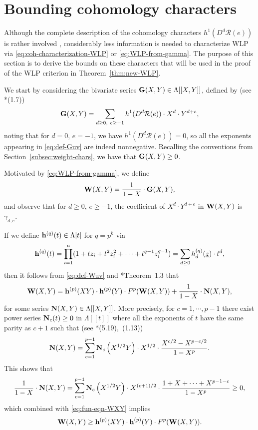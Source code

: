 \documentclass[11pt,reqno]{amsart}
\newcommand{\bG}{{\bf G}}
\newcommand{\bh}{{\bf h}}
\newcommand{\bN}{{\bf N}}
\newcommand{\bW}{{\bf W}}
\newcommand{\mc}[1]{\mathcal{#1}}
\newcommand{\ul}[1]{\underline{#1}}
\theoremstyle{definition}
\theoremstyle{remark}
\numberwithin{equation}{section}
\begin{document}
\section{Bounding cohomology characters}
\label{sec:bound-coh}

Although the complete description of the cohomology characters $h^1(D^d\mc{R}(e))$ is rather involved \cite{KMRR}, considerably less information is needed to characterize WLP via \eqref{eq:coh-characterization-WLP} or \eqref{eq:WLP-from-gamma}. The purpose of this section is to derive the bounds on these characters that will be used in the proof of the WLP criterion in Theorem~\ref{thm:new-WLP}. 

We start by considering the bivariate series $\bG(X,Y)\in\Lambda[[X,Y]]$, defined by (see \cite{KMRR}*{(1.7)})
\begin{equation}\label{eq:def-Guv}
    \bG(X,Y) = \sum_{d\geq 0,\ e\geq -1} h^1(D^d\mc{R}(e))\cdot X^d\cdot Y^{d+e},
\end{equation}
noting that for $d=0$, $e=-1$, we have $h^1(D^d\mc{R}(e))=0$, so all the exponents appearing in \eqref{eq:def-Guv} are indeed nonnegative. Recalling the conventions from Section~\ref{subsec:weight-chars}, we have that $\bG(X,Y)\geq 0$.

Motivated by \eqref{eq:WLP-from-gamma}, we define
\begin{equation}\label{eq:def-Wuv}
    \bW(X,Y) = \frac{1}{1-X}\cdot \bG(X,Y),
\end{equation}
and observe that for $d\geq 0$, $e\geq -1$, the coefficient of $X^d\cdot Y^{d+e}$ in $\bW(X,Y)$ is $\gamma_{d,e}$. 

If we define $\bh^{(q)}(t)\in\Lambda[t]$ for $q=p^k$ via
\[\bh^{(q)}(t) = \prod_{i=1}^n(1+tz_i+t^2z_i^2+\cdots+t^{q-1}z_i^{q-1}) = \sum_{d\geq 0}h^{(q)}_d(\ul{z})\cdot t^d,\]
then it follows from \eqref{eq:def-Wuv} and \cite{KMRR}*{Theorem~1.3} that 
\begin{equation}\label{eq:fun-eqn-WXY}
\bW(X,Y) = \bh^{(p)}(XY)\cdot \bh^{(p)}(Y)\cdot F^p(\bW(X,Y))+\frac{1}{1-X}\cdot\bN(X,Y),
\end{equation}
for some series $\bN(X,Y)\in\Lambda[[X,Y]]$. More precisely, for $c=1,\cdots,p-1$ there exist power series $\bN_c(t)\geq 0$ in $\Lambda[[t]]$ where all the exponents of $t$ have the same parity as $c+1$ such that (see \cite{KMRR}*{(5.19),\ (1.13)})
\[    
\bN(X,Y) = \sum_{c=1}^{p-1} \bN_c\left(X^{1/2}Y\right)\cdot X^{1/2}\cdot\frac{X^{c/2}-X^{p-c/2}}{1-X^p}.
\]
This shows that
\[\frac{1}{1-X}\cdot\bN(X,Y) = \sum_{c=1}^{p-1}\bN_c\left(X^{1/2}Y\right)\cdot X^{(c+1)/2}\cdot\frac{1+X+\cdots+ X^{p-1-c}}{1-X^p} \geq 0,\]
which combined with \eqref{eq:fun-eqn-WXY} implies
\begin{equation}\label{eq:W-geq-hhFW}
    \bW(X,Y) \geq \bh^{(p)}(XY)\cdot \bh^{(p)}(Y)\cdot F^p(\bW(X,Y)).
\end{equation}
\end{document}
